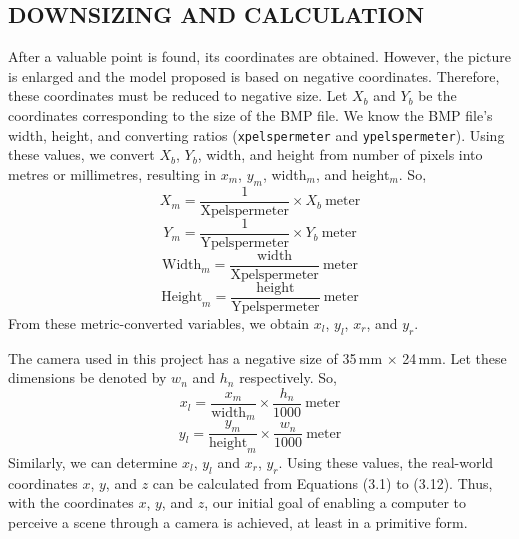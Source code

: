 \documentclass[12pt]{report}
\begin{document}
\subsection{DOWNSIZING AND CALCULATION} After a valuable point is found, its coordinates are obtained. However, the picture is enlarged and the model proposed is based on negative coordinates. Therefore, these coordinates must be reduced to negative size. Let $X_b$ and $Y_b$ be the coordinates corresponding to the size of the BMP file. We know the BMP file's width, height, and converting ratios (\texttt{xpelspermeter} and \texttt{ypelspermeter}). Using these values, we convert $X_b$, $Y_b$, width, and height from number of pixels into metres or millimetres, resulting in $x_m$, $y_m$, width$_m$, and height$_m$. \vspace{0.5cm} So, \begin{equation} X_m = \frac{1}{\text{Xpelspermeter}} \times X_b \ \text{meter} \tag{5.1} \end{equation} \begin{equation} Y_m = \frac{1}{\text{Ypelspermeter}} \times Y_b \ \text{meter} \tag{5.2} \end{equation} \begin{equation} \text{Width}_m = \frac{\text{width}} {\text{Xpelspermeter}} \ \text{meter} \tag{5.3} \end{equation} \begin{equation} \text{Height}_m = \frac{\text{height}} {\text{Ypelspermeter}} \ \text{meter} \tag{5.4} \end{equation} From these metric-converted variables, we obtain $x_l$, $y_l$, $x_r$, and $y_r$.

The camera used in this project has a negative size of 35\,mm $\times$ 24\,mm. Let these dimensions be denoted by $w_n$ and $h_n$ respectively. \vspace{0.5cm} So, \begin{equation} x_l = \frac{x_m}{\text{width}_m} \times \frac{h_n}{1000} \ \text{meter} \tag{5.5} \end{equation} \begin{equation} y_l = \frac{y_m}{\text{height}_m} \times \frac{w_n}{1000} \ \text{meter} \tag{5.6} \end{equation} Similarly, we can determine $x_l$, $y_l$ and $x_r$, $y_r$. Using these values, the real-world coordinates $x$, $y$, and $z$ can be calculated from Equations (3.1) to (3.12). \vspace{0.5cm} Thus, with the coordinates $x$, $y$, and $z$, our initial goal of enabling a computer to perceive a scene through a camera is achieved, at least in a primitive form.
\end{document}
